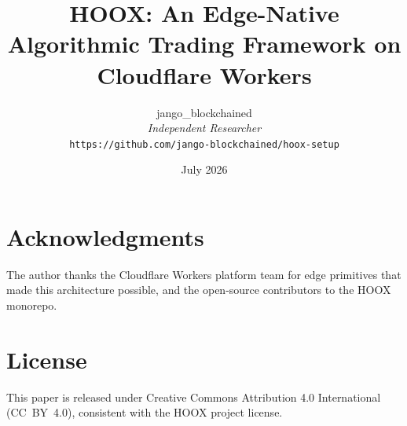 \documentclass[10pt,a4paper]{article}
\title{\textbf{HOOX: An Edge-Native Algorithmic Trading Framework on Cloudflare Workers}}
\author{
  jango\_blockchained \\
  \small\textit{Independent Researcher} \\
  \small\texttt{https://github.com/jango-blockchained/hoox-setup}
}
\date{July 2026}
\begin{document}
\maketitle




















\section*{Acknowledgments}

The author thanks the Cloudflare Workers platform team for edge primitives that made this architecture possible, and the open-source contributors to the \textsc{HOOX} monorepo.

\section*{License}

This paper is released under Creative Commons Attribution 4.0 International (CC~BY~4.0), consistent with the \textsc{HOOX} project license.




\appendix







\end{document}
